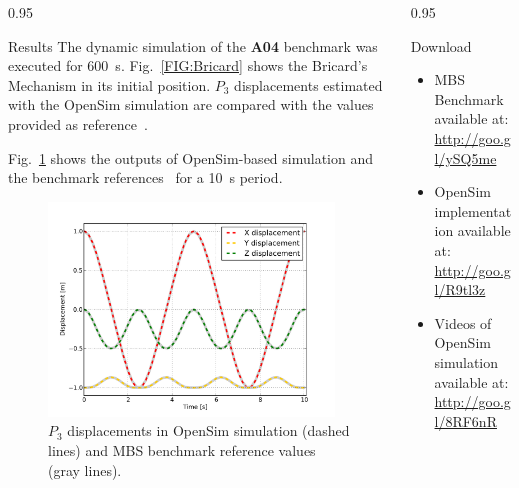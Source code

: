 \documentclass[final]{beamer}
\newlength{\onecolwid}
\newlength{\twocolwid}
\begin{document}
\begin{frame}[t]
\begin{columns}[t]
\begin{column}{\twocolwid}
\begin{columns}[t, totalwidth=\twocolwid]
\begin{column}{0.95\onecolwid}
\begin{block}{Results}
The dynamic simulation of the \textbf{A04} benchmark was executed for \SI{600}{\second}. Fig.~\ref{FIG:Bricard} shows the Bricard's Mechanism in its initial position.
$P_3$ displacements estimated with the OpenSim simulation are compared with the values provided as reference~\cite{gonzalez2006benchmarking}.  

Fig.~\ref{FIG:simulationPlot} shows the outputs of OpenSim-based simulation and the benchmark references~\cite{gonzalez2006benchmarking} for a \SI{10}{\second} period.


\begin{figure}[h]
\centering
\includegraphics[width=0.95\textwidth]{4MBS_PlotResults.pdf}
\caption{$P_3$ displacements in OpenSim simulation
(dashed lines) and MBS benchmark reference values (gray lines).}
\label{FIG:simulationPlot}
\end{figure}

\end{block}
\end{column}
  

\end{columns}


\end{column}

\begin{column}{0.95\onecolwid} %
\begin{block}{Download}
\begin{itemize}
\item MBS Benchmark available at: \url{http://goo.gl/ySQ5me}
\item OpenSim implementation available at: \url{http://goo.gl/R9tl3z}
\item Videos of OpenSim simulation available at: \url{http://goo.gl/8RF6nR}
\end{itemize}
\end{block}


\end{column}
\end{columns}
\end{frame}
\end{document}

